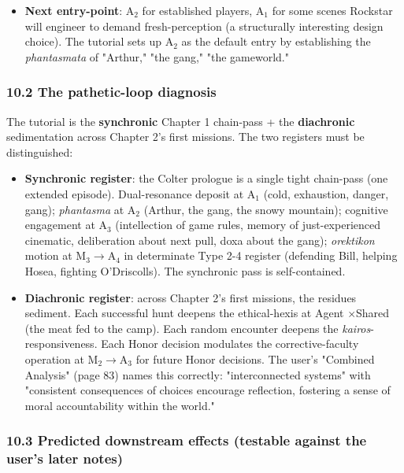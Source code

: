 \documentclass[11pt]{report}
\begin{document}
\begin{itemize}
\item \textbf{Next entry-point}: A$_2$ for established players, A$_1$ for some scenes Rockstar will engineer to demand fresh-perception (a structurally interesting design choice). The tutorial sets up A$_2$ as the default entry by establishing the \textit{phantasmata} of "Arthur," "the gang," "the gameworld."
\end{itemize}


\subsubsection{10.2 The pathetic-loop diagnosis}


The tutorial is the \textbf{synchronic} Chapter 1 chain-pass + the \textbf{diachronic} sedimentation across Chapter 2's first missions. The two registers must be distinguished:


\begin{itemize}
\item \textbf{Synchronic register}: the Colter prologue is a single tight chain-pass (one extended episode). Dual-resonance deposit at A$_1$ (cold, exhaustion, danger, gang); \textit{phantasma} at A$_2$ (Arthur, the gang, the snowy mountain); cognitive engagement at A$_3$ (intellection of game rules, memory of just-experienced cinematic, deliberation about next pull, doxa about the gang); \textit{orektikon} motion at M$_3$$\rightarrow$\allowbreak A$_4$ in determinate Type 2-4 register (defending Bill, helping Hosea, fighting O'Driscolls). The synchronic pass is self-contained.
\item \textbf{Diachronic register}: across Chapter 2's first missions, the residues sediment. Each successful hunt deepens the ethical-hexis at Agent $\times$\allowbreak  Shared (the meat fed to the camp). Each random encounter deepens the \textit{kairos}-responsiveness. Each Honor decision modulates the corrective-faculty operation at M$_2$$\rightarrow$\allowbreak A$_3$ for future Honor decisions. The user's "Combined Analysis" (page 83) names this correctly: "interconnected systems" with "consistent consequences of choices encourage reflection, fostering a sense of moral accountability within the world."
\end{itemize}


\subsubsection{10.3 Predicted downstream effects (testable against the user's later notes)}
\end{document}
